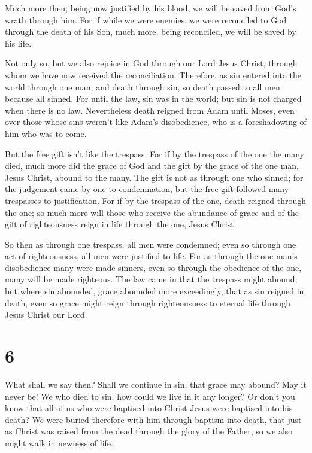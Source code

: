  Much more then, being now justified by his blood, we will
be saved from God's wrath through him.  For if while we
were enemies, we were reconciled to God through the death of his Son,
much more, being reconciled, we will be saved by his life.

 Not only so, but we also rejoice in God through our Lord
Jesus Christ, through whom we have now received the reconciliation.
 Therefore, as sin entered into the world through one
man, and death through sin, so death passed to all men because all
sinned.  For until the law, sin was in the world; but sin
is not charged when there is no law.  Nevertheless death
reigned from Adam until Moses, even over those whose sins weren't like
Adam's disobedience, who is a foreshadowing of him who was to come.

 But the free gift isn't like the trespass. For if by the
trespass of the one the many died, much more did the grace of God and
the gift by the grace of the one man, Jesus Christ, abound to the many.
 The gift is not as through one who sinned; for the
judgement came by one to condemnation, but the free gift followed many
trespasses to justification.  For if by the trespass of
the one, death reigned through the one; so much more will those who
receive the abundance of grace and of the gift of righteousness reign in
life through the one, Jesus Christ.

 So then as through one trespass, all men were condemned;
even so through one act of righteousness, all men were justified to
life.  For as through the one man's disobedience many
were made sinners, even so through the obedience of the one, many will
be made righteous.  The law came in that the trespass
might abound; but where sin abounded, grace abounded more exceedingly,
 that as sin reigned in death, even so grace might reign
through righteousness to eternal life through Jesus Christ our Lord.

\hypertarget{section-5}{%
\section{6}\label{section-5}}

 What shall we say then? Shall we continue in sin, that
grace may abound?  May it never be! We who died to sin,
how could we live in it any longer?  Or don't you know
that all of us who were baptised into Christ Jesus were baptised into
his death?  We were buried therefore with him through
baptism into death, that just as Christ was raised from the dead through
the glory of the Father, so we also might walk in newness of life.

